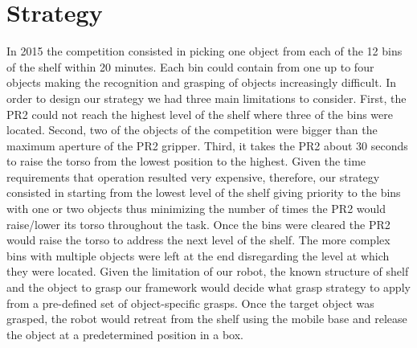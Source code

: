 \section{Strategy}
\label{sec:strategy}

In 2015 the competition consisted in picking one object from each of the 12 bins of the shelf within 20 minutes. Each bin could contain from one up to four objects making the recognition and grasping of objects increasingly difficult. In order to design our strategy we had three main limitations to consider. First, the PR2 could not reach the highest level of the shelf where three of the bins were located. Second, two of the objects of the competition were bigger than the maximum aperture of the PR2 gripper. Third, it takes the PR2 about 30 seconds to raise the torso from the lowest position to the highest. Given the time requirements that operation resulted very expensive, therefore, our strategy consisted in starting from the lowest level of the shelf giving priority to the bins with one or two objects thus minimizing the number
of times the PR2 would raise/lower its torso throughout the task. Once the bins were cleared the PR2 would raise the torso to address the next level of the shelf. The more complex bins with multiple objects were left at the end disregarding the level at which they were located. Given the limitation of our robot, the known structure of shelf and the object to grasp our framework would decide what grasp strategy to apply from a pre-defined set of object-specific grasps.
Once the target object was grasped, the robot would retreat from the shelf using the
mobile base and release the object at a predetermined position in a box.
